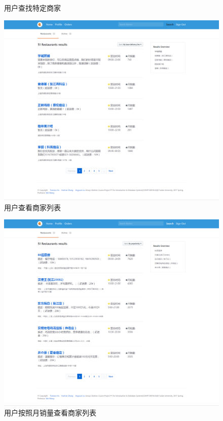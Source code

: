\documentclass[12pt, oneside,a4paper]{article}
\begin{document}
\begin{itemize}
\begin{figure}[H]
     \caption{\small{用户查找特定商家}}
  \end{figure}
  \begin{figure}[H]
   \centering
     \includegraphics[width=6.00in]{cu-re.png}
     \caption{\small{用户查看商家列表}}
  \end{figure}
  \begin{figure}[H]
   \centering
     \includegraphics[width=6.00in]{cu-re-po.png}
     \caption{\small{用户按照月销量查看商家列表}}
  \end{figure}

\end{itemize}
\end{document}
